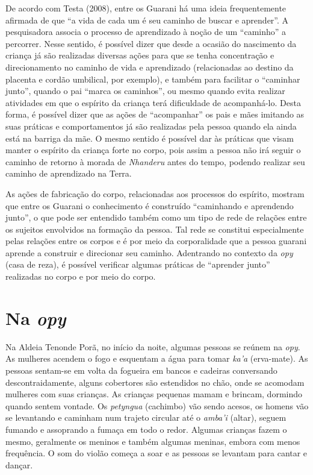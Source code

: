 De acordo com Testa (2008), entre os Guarani há uma ideia frequentemente
afirmada de que ``a vida de cada um é seu caminho de buscar e aprender''.
A pesquisadora associa o processo de aprendizado à noção de um ``caminho''
a percorrer. Nesse sentido, é possível dizer que desde a ocasião do
nascimento da criança já são realizadas diversas ações para que se
tenha concentração e direcionamento no caminho de vida e aprendizado
(relacionadas ao destino da placenta e cordão umbilical, por exemplo),
e também para facilitar o ``caminhar junto'', quando o pai ``marca os
caminhos'', ou mesmo quando evita realizar atividades em que o espírito
da criança terá dificuldade de acompanhá-lo. Desta forma, é possível
dizer que as ações de ``acompanhar'' os pais e mães imitando as suas
práticas e comportamentos já são realizadas pela pessoa quando ela
ainda está na barriga da mãe. O mesmo sentido é possível dar às
práticas que visam manter o espírito da criança forte no corpo, pois
assim a pessoa não irá seguir o caminho de retorno à morada de \emph{Nhanderu}
antes do tempo, podendo realizar seu caminho de aprendizado na Terra. 

As ações de fabricação do corpo, relacionadas aos processos do espírito,
mostram que entre os Guarani o conhecimento é construído ``caminhando e
aprendendo junto'', o que pode ser entendido também como um tipo de rede
de relações entre os sujeitos envolvidos na formação da pessoa. Tal
rede se constitui especialmente pelas relações entre os corpos e é por
meio da corporalidade que a pessoa guarani aprende a construir e
direcionar seu caminho. Adentrando no contexto da \emph{opy} (casa de reza), é
possível verificar algumas práticas de ``aprender junto'' realizadas no
corpo e por meio do corpo.

\section{Na \emph{opy}}

Na Aldeia Tenonde Porã, no início da noite, algumas pessoas se reúnem na
\emph{opy}. As mulheres acendem o fogo e esquentam a água para tomar \emph{ka’a}
(erva-mate). As pessoas sentam-se em volta da fogueira em bancos e
cadeiras conversando descontraidamente, alguns cobertores são
estendidos no chão, onde se acomodam mulheres com suas crianças. As
crianças pequenas mamam e brincam, dormindo quando sentem vontade. Os
\emph{petyngua} (cachimbo) vão sendo acesos, os homens vão se levantando e
caminham num trajeto circular até o \emph{amba’i} (altar), seguem fumando e
assoprando a fumaça em todo o redor. Algumas crianças fazem o mesmo,
geralmente os meninos e também algumas meninas, embora com menos
frequência. O som do violão começa a soar e as pessoas se levantam para
cantar e dançar. 

